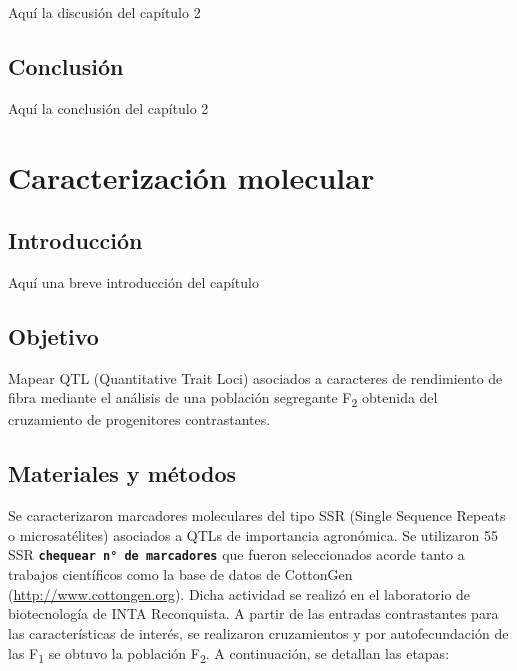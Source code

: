\documentclass[12pt,oneside]{reedthesis}
\begin{document}
Aquí la discusión del capítulo 2

\section{Conclusión}\label{conclusiuxf3n-1}

Aquí la conclusión del capítulo 2

\chapter{Caracterización molecular}\label{ref-labels}

\section{Introducción}\label{introducciuxf3n-3}

Aquí una breve introducción del capítulo

\section{Objetivo}\label{objetivo-2}

Mapear QTL (Quantitative Trait Loci) asociados a caracteres de rendimiento de fibra mediante el análisis de una población segregante F\textsubscript{2} obtenida del cruzamiento de progenitores contrastantes.

\section{Materiales y métodos}\label{materiales-y-muxe9todos-2}

Se caracterizaron marcadores moleculares del tipo SSR (Single Sequence Repeats o microsatélites) asociados a QTLs de importancia agronómica. Se utilizaron 55 SSR \textbf{\texttt{chequear\ n°\ de\ marcadores}} que fueron seleccionados acorde tanto a trabajos científicos \autocite{zhang2005,shen2007,wang2007,wang2014,xia2014,wang2015,an2010,liu2012,qin2015,shi2015,su2016,zhang2016,ademe2017,liu2017,iqbal2017,li2017,baytar2018,liu2018} como la base de datos de CottonGen (\url{http://www.cottongen.org}). Dicha actividad se realizó en el laboratorio de biotecnología de INTA Reconquista. A partir de las entradas contrastantes para las características de interés, se realizaron cruzamientos y por autofecundación de las F\textsubscript{1} se obtuvo la población F\textsubscript{2}. A continuación, se detallan las etapas:
\end{document}
